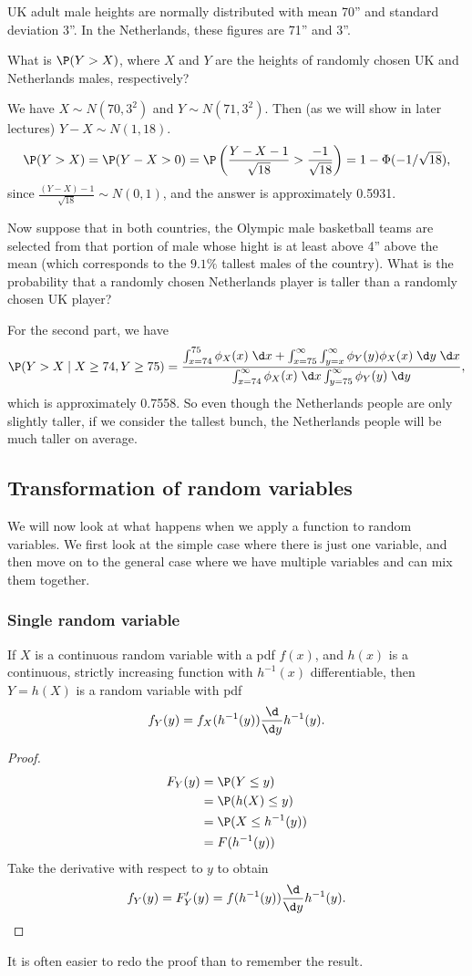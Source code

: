 \documentclass[a4paper]{article}
\begin{document}
\begin{eg}
  UK adult male heights are normally distributed with mean 70'' and standard deviation 3''. In the Netherlands, these figures are 71'' and 3''.

  What is $\P(Y > X)$, where $X$ and $Y$ are the heights of randomly chosen UK and Netherlands males, respectively?

  We have $X\sim N(70, 3^2)$ and $Y\sim N(71, 3^2)$. Then (as we will show in later lectures) $Y - X \sim N(1, 18)$.
  \[
    \P(Y > X) = \P(Y - X > 0) = \P\left(\frac{Y - X - 1}{\sqrt{18}} > \frac{-1}{\sqrt{18}}\right) = 1 - \Phi(-1/\sqrt{18}),
  \]
  since $\frac{(Y - X) - 1}{\sqrt{18}}\sim N(0, 1)$, and the answer is approximately 0.5931.

  Now suppose that in both countries, the Olympic male basketball teams are selected from that portion of male whose hight is at least above 4'' above the mean (which corresponds to the $9.1\%$ tallest males of the country). What is the probability that a randomly chosen Netherlands player is taller than a randomly chosen UK player?

  For the second part, we have
  \[
    \P(Y > X\mid X \geq 74, Y \geq 75) = \frac{\int_{x = 74}^{75} \phi_X(x)\;\d x + \int_{x = 75}^\infty \int_{y=x}^\infty \phi_Y(y)\phi_X(x)\;\d y\;\d x}{\int_{x=74}^\infty \phi_X(x)\;\d x \int_{y=75}^\infty \phi_Y(y)\;\d y},
  \]
  which is approximately 0.7558. So even though the Netherlands people are only slightly taller, if we consider the tallest bunch, the Netherlands people will be much taller on average.
\end{eg}

\subsection{Transformation of random variables}
We will now look at what happens when we apply a function to random variables. We first look at the simple case where there is just one variable, and then move on to the general case where we have multiple variables and can mix them together.
\subsubsection*{Single random variable}
\begin{thm}
  If $X$ is a continuous random variable with a pdf $f(x)$, and $h(x)$ is a continuous, strictly increasing function with $h^{-1}(x)$ differentiable, then $Y = h(X)$ is a random variable with pdf
  \[
    f_Y(y) = f_X(h^{-1}(y))\frac{\d }{\d y}h^{-1}(y).
  \]
\end{thm}
\begin{proof}
  \begin{align*}
    F_Y(y) &= \P(Y \leq y)\\
    &= \P(h(X) \leq y)\\
    &= \P(X \leq h^{-1}(y))\\
    &= F(h^{-1}(y))
  \end{align*}
  Take the derivative with respect to $y$ to obtain
  \[
    f_Y(y) = F'_Y(y) = f(h^{-1}(y))\frac{\d}{\d y}h^{-1}(y).
  \]
\end{proof}
It is often easier to redo the proof than to remember the result.
\end{document}
